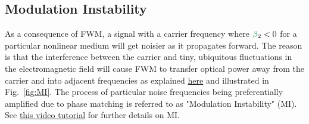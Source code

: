 \subsection{Modulation Instability}
As a consequence of FWM, a signal with a carrier frequency where $\betag_2<0$ for a particular nonlinear medium will get noisier as it propagates forward. The reason is that the interference between the carrier and tiny, ubiquitous fluctuations in the electromagnetic field will cause FWM to transfer optical power away from the carrier and into adjacent frequencies as explained \href{https://prefetch.eu/know/concept/modulational-instability/}{here} and illustrated in Fig.~\ref{fig:MI}. The process of particular noise frequencies being preferentially amplified due to phase matching is referred to as "Modulation Instability" (MI). See \href{https://youtu.be/VtaoPd0Fwj8}{this video tutorial} for further details on MI. 

